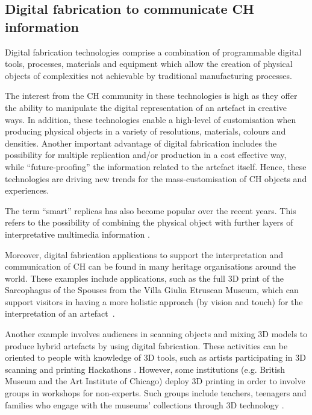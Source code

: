 \documentclass[acmlarge,screen,dvipsnames]{acmart}
\begin{document}
\subsection{Digital fabrication to communicate CH information}

Digital fabrication technologies comprise a combination of
programmable digital tools, processes, materials and equipment which
allow the creation of physical objects of complexities not achievable
by traditional manufacturing processes.

The interest from the CH community in these technologies is high as
they offer the ability to manipulate the digital representation of an
artefact in creative ways. In addition, these technologies enable a
high-level of customisation when producing physical objects in a
variety of resolutions, materials, colours and densities. Another
important advantage of digital fabrication includes the possibility
for multiple replication and/or production in a cost effective way,
while ``future-proofing'' the information related to the artefact
itself. Hence, these technologies are driving new trends for the
mass-customisation of CH objects and experiences.

The term ``smart'' replicas has also become popular over the recent
years. This refers to the possibility of combining the physical object
with further layers of interpretative multimedia information
\cite{Capurro2015,Marshall2016}.

Moreover, digital fabrication applications to support the
interpretation and communication of CH can be found in many heritage
organisations around the world. These examples include applications,
such as the full 3D print of the Sarcophagus of the Spouses from the
Villa Giulia Etruscan Museum, which can support visitors in having a
more holistic approach (by vision and touch) for the interpretation of
an artefact~\cite{Guidazzoli2014}.

Another example involves audiences in scanning objects and mixing 3D
models to produce hybrid artefacts by using digital fabrication. These
activities can be oriented to people with knowledge of 3D tools, such
as artists participating in 3D scanning and printing Hackathons
\cite{Mullaney2012,Neely2013}. However, some institutions
(e.g. British Museum and the Art Institute of Chicago) deploy 3D
printing in order to involve groups in workshops for non-experts. Such
groups include teachers, teenagers and families who engage with the
museums' collections through 3D technology
\cite{BritishMuseum2016,Neely2015,Miles2015}.
\end{document}
